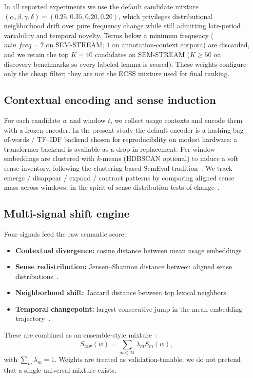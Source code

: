 \documentclass{llncs}
\newcommand{\addrev}[1]{{\color{blue}#1}}
\begin{document}
\addrev{In all reported experiments we use the default candidate mixture
$(\alpha,\beta,\gamma,\delta)=(0.25,0.35,0.20,0.20)$, which privileges distributional neighborhood drift over pure frequency change while still admitting late-period variability and temporal novelty.
Terms below a minimum frequency ($\mathit{min\_freq}=2$ on SEM-STREAM; $1$ on annotation-context corpora) are discarded, and we retain the top $K{=}40$ candidates on SEM-STREAM ($K{\ge}50$ on discovery benchmarks so every labeled lemma is scored).
These weights configure only the cheap filter; they are not the ECSS mixture used for final ranking.}

\subsection{Contextual encoding and sense induction}
For each candidate $w$ and window $t$, we collect usage contexts and encode them with a frozen encoder.
In the present study the default encoder is a hashing bag-of-words / TF--IDF backend chosen for reproducibility on modest hardware; a transformer backend is available as a drop-in replacement.
Per-window embeddings are clustered with $k$-means (HDBSCAN optional) to induce a soft sense inventory, following the clustering-based SemEval tradition~\cite{cuba2020sensecluster,rother2020cmce}.
We track emerge / disappear / expand / contract patterns by comparing aligned sense mass across windows, in the spirit of sense-distribution tests of change~\cite{tang2023cansense,arefyev2020bos}.

\subsection{Multi-signal shift engine}
Four signals feed the raw semantic score:
\begin{itemize}
\item \textbf{Contextual divergence:} cosine distance between mean usage embeddings~\cite{beck2020diasense,martinc2020discovery}.
\item \textbf{Sense redistribution:} Jensen--Shannon distance between aligned sense distributions~\cite{tang2023cansense}.
\item \textbf{Neighborhood shift:} Jaccard distance between top lexical neighbors.
\item \textbf{Temporal changepoint:} largest consecutive jump in the mean-embedding trajectory~\cite{zhou2020temporalteller,periti2023studying}.
\end{itemize}
These are combined as an ensemble-style mixture~\cite{gruppi2020schme,ansari2026rtlsdr}:
\begin{equation}
S_{\mathrm{raw}}(w)=\sum_{m\in\mathcal{M}} \lambda_m S_m(w),
\end{equation}
with $\sum_m \lambda_m=1$.
Weights are treated as validation-tunable; we do not pretend that a single universal mixture exists.
\end{document}
